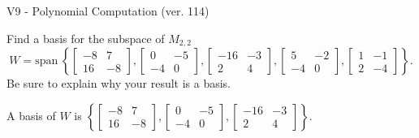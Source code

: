 \begin{exercise}
  \begin{exerciseTitle}V9 - Polynomial Computation (ver. 114)\end{exerciseTitle}
  \begin{exerciseStatement}
    Find a basis for the subspace of \(M_{2,2}\) 
\[W=\mathrm{span}\ \left\{\left[\begin{array}{cc}
-8 & 7 \\
16 & -8
\end{array}\right] , \left[\begin{array}{cc}
0 & -5 \\
-4 & 0
\end{array}\right] , \left[\begin{array}{cc}
-16 & -3 \\
2 & 4
\end{array}\right] , \left[\begin{array}{cc}
5 & -2 \\
-4 & 0
\end{array}\right] , \left[\begin{array}{cc}
1 & -1 \\
2 & -4
\end{array}\right]\right\}.\]
 Be sure to explain why your result is a basis.


  \end{exerciseStatement}
  \begin{exerciseAnswer}
   A basis of \(W\) is  \(\left\{\left[\begin{array}{cc}
-8 & 7 \\
16 & -8
\end{array}\right] , \left[\begin{array}{cc}
0 & -5 \\
-4 & 0
\end{array}\right] , \left[\begin{array}{cc}
-16 & -3 \\
2 & 4
\end{array}\right]\right\}\).
  


  \end{exerciseAnswer}
\end{exercise}
